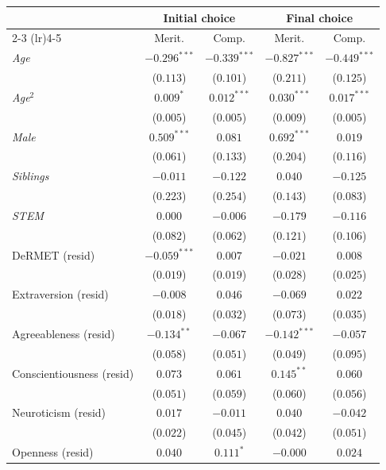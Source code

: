\begin{table}[htpb]
\centering
\footnotesize
\begin{threeparttable}
\begin{tabular}{l cc cc}
\toprule
 & \multicolumn{2}{c}{Initial choice} & \multicolumn{2}{c}{Final choice} \\
\cmidrule(lr){2-3} \cmidrule(lr){4-5}
 & Merit. & Comp. & Merit. & Comp. \\
\midrule
\textit{Age} & $-0.296^{***}$ & $-0.339^{***}$ & $-0.827^{***}$ & $-0.449^{***}$ \\
           & ($0.113$) & ($0.101$) & ($0.211$) & ($0.125$) \\
\textit{Age}$^2$ & $0.009^{*}$ & $0.012^{***}$ & $0.030^{***}$ & $0.017^{***}$ \\
           & ($0.005$) & ($0.005$) & ($0.009$) & ($0.005$) \\
\textit{Male} & $0.509^{***}$ & $0.081$ & $0.692^{***}$ & $0.019$ \\
           & ($0.061$) & ($0.133$) & ($0.204$) & ($0.116$) \\
\textit{Siblings} & $-0.011$ & $-0.122$ & $0.040$ & $-0.125$ \\
           & ($0.223$) & ($0.254$) & ($0.143$) & ($0.083$) \\
\textit{STEM} & $0.000$ & $-0.006$ & $-0.179$ & $-0.116$ \\
           & ($0.082$) & ($0.062$) & ($0.121$) & ($0.106$) \\
DeRMET (resid) & $-0.059^{***}$ & $0.007$ & $-0.021$ & $0.008$ \\
           & ($0.019$) & ($0.019$) & ($0.028$) & ($0.025$) \\
Extraversion (resid) & $-0.008$ & $0.046$ & $-0.069$ & $0.022$ \\
           & ($0.018$) & ($0.032$) & ($0.073$) & ($0.035$) \\
Agreeableness (resid) & $-0.134^{**}$ & $-0.067$ & $-0.142^{***}$ & $-0.057$ \\
           & ($0.058$) & ($0.051$) & ($0.049$) & ($0.095$) \\
Conscientiousness (resid) & $0.073$ & $0.061$ & $0.145^{**}$ & $0.060$ \\
           & ($0.051$) & ($0.059$) & ($0.060$) & ($0.056$) \\
Neuroticism (resid) & $0.017$ & $-0.011$ & $0.040$ & $-0.042$ \\
           & ($0.022$) & ($0.045$) & ($0.042$) & ($0.051$) \\
Openness (resid) & $0.040$ & $0.111^{*}$ & $-0.000$ & $0.024$ \\

\end{tabular}
\end{threeparttable}
\end{table}
